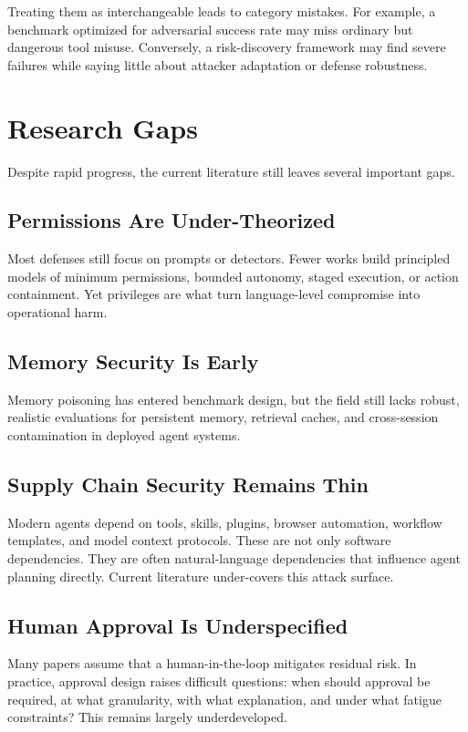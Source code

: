 \documentclass[conference]{IEEEtran}
\begin{document}
Treating them as interchangeable leads to category mistakes. For example, a benchmark optimized for adversarial success rate may miss ordinary but dangerous tool misuse. Conversely, a risk-discovery framework may find severe failures while saying little about attacker adaptation or defense robustness.

\section{Research Gaps}

Despite rapid progress, the current literature still leaves several important gaps.

\subsection{Permissions Are Under-Theorized}

Most defenses still focus on prompts or detectors. Fewer works build principled models of minimum permissions, bounded autonomy, staged execution, or action containment. Yet privileges are what turn language-level compromise into operational harm.

\subsection{Memory Security Is Early}

Memory poisoning has entered benchmark design, but the field still lacks robust, realistic evaluations for persistent memory, retrieval caches, and cross-session contamination in deployed agent systems.

\subsection{Supply Chain Security Remains Thin}

Modern agents depend on tools, skills, plugins, browser automation, workflow templates, and model context protocols. These are not only software dependencies. They are often natural-language dependencies that influence agent planning directly. Current literature under-covers this attack surface.

\subsection{Human Approval Is Underspecified}

Many papers assume that a human-in-the-loop mitigates residual risk. In practice, approval design raises difficult questions: when should approval be required, at what granularity, with what explanation, and under what fatigue constraints? This remains largely underdeveloped.
\end{document}
